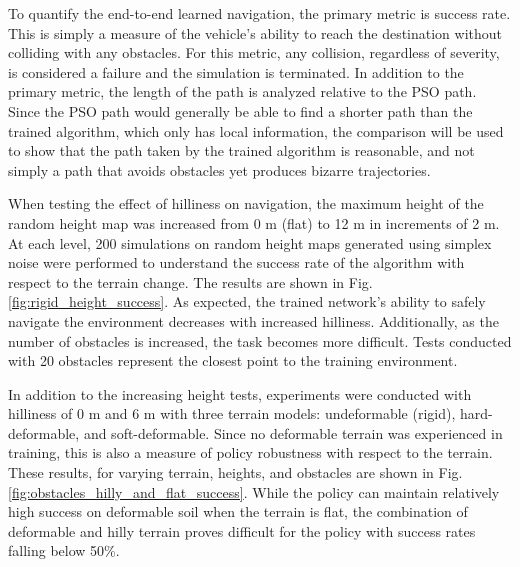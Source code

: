 %
%

To quantify the end-to-end learned navigation, the primary metric is success rate. This is simply a measure of the vehicle's ability to reach the destination without colliding with any obstacles. For this metric, any collision, regardless of severity, is considered a failure and the simulation is terminated. In addition to the primary metric, the length of the path is analyzed relative to the PSO path. Since the PSO path would generally be able to find a shorter path than the trained algorithm, which only has local information, the comparison will be used to show that the path taken by the trained algorithm is reasonable, and not simply a path that avoids obstacles yet produces bizarre trajectories.

When testing the effect of hilliness on navigation, the maximum height of the random height map was increased from 0 m (flat) to 12 m in increments of 2 m. At each level, 200 simulations on random height maps generated using simplex noise were performed to understand the success rate of the algorithm with respect to the terrain change. The results are shown in Fig. \ref{fig:rigid_height_success}. As expected, the trained network's ability to safely navigate the environment decreases with increased hilliness. Additionally, as the number of obstacles is increased, the task becomes more difficult. Tests conducted with 20 obstacles represent the closest point to the training environment.

In addition to the increasing height tests, experiments were conducted with hilliness of 0 m and 6 m with three terrain models: undeformable (rigid), hard-deformable, and soft-deformable. Since no deformable terrain was experienced in training, this is also a measure of policy robustness with respect to the terrain. These results, for varying terrain, heights, and obstacles are shown in Fig. \ref{fig:obstacles_hilly_and_flat_success}. While the policy can maintain relatively high success on deformable soil when the terrain is flat, the combination of deformable and hilly terrain proves difficult for the policy with success rates falling below 50\%.

